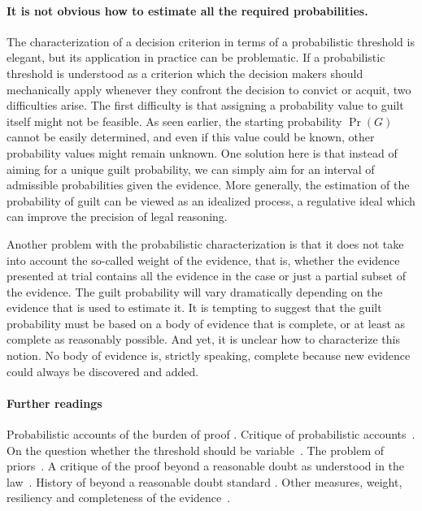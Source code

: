 \documentclass[10pt]{article}
\begin{document}

\paragraph{It is not obvious how to estimate all the required probabilities.}

The characterization of a decision criterion in terms of a probabilistic threshold is elegant, but its application in practice can be problematic. If a probabilistic threshold is understood as a criterion which the decision makers 
 should mechanically apply whenever they confront the decision to convict or acquit, two difficulties arise. The first difficulty is that assigning a probability value to guilt itself might not be feasible. As seen earlier, the starting probability $\Pr(G)$ cannot be easily determined, 
and even if this value could be known, other probability values might remain unknown. One solution here is that instead 
 of aiming for a unique guilt probability, we can simply aim for an interval of admissible probabilities given the evidence. 
 More generally, the estimation of the probability of guilt can be viewed as an idealized process, a regulative ideal which can improve the precision of legal reasoning. 

Another problem with the probabilistic characterization 
is that it does not take into account the so-called weight of the evidence, that is, whether the evidence presented at trial contains all the evidence 
in the case or just a partial subset of the evidence. The guilt probability will vary dramatically 
depending on the evidence that is used to estimate it. It is tempting to suggest that the guilt probability must be based on a body 
of evidence that is complete, or at least as complete as reasonably possible. And yet, it is unclear how to characterize this notion.
No body of evidence is, strictly speaking, complete because new evidence could always be discovered and added. 

\paragraph{Further readings}

Probabilistic accounts of the burden of proof
\citep{kaplan1968, kaye1986, kaye1999, hamer2004, cheng2013}.
Critique of probabilistic accounts~\citep{cohen1977, nesson79, thomson86, stein05, ho08, pardoAllen2008, haack2014}.
On the question whether the threshold should be variable~\citep{kaplow2012, picinali2013}.
The problem of priors~\citep{finkelsteinFairley1970, friedman2000}.
A critique of the proof beyond a reasonable doubt 
as understood in the law~\citep{laudan2006}.
History of beyond a reasonable doubt standard 
\citep{shapiro1991, whitman2008}. Other measures, weight, resiliency and completeness 
of the evidence~\citep{kaye1999, stein05, nance2016}.
\end{document}
